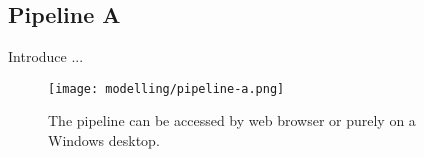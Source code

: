 \subsection{Pipeline A}\label{subsec:pipeline-a}

Introduce ...

\begin{figure}[H]
    \centering
    \texttt{[image: modelling/pipeline-a.png]}
    \caption{The pipeline can be accessed by web browser or purely on a Windows desktop.}
    \label{fig:p:a}
\end{figure}



